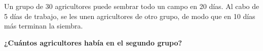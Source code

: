 \question[10] Un grupo de 30 agricultores puede sembrar todo un campo en 20 días. Al cabo de 5 días de trabajo,
se les unen agricultores de otro grupo, de modo que en 10 días
más terminan la siembra.

\textbf{¿Cuántos agricultores había en el segundo grupo?}

\begin{solutionbox}{3cm}

\end{solutionbox}